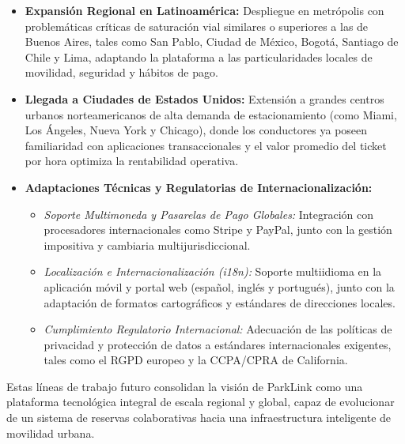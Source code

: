 \begin{itemize}
    \item \textbf{Expansión Regional en Latinoamérica:} Despliegue en metrópolis con problemáticas críticas de saturación vial similares o superiores a las de Buenos Aires, tales como San Pablo, Ciudad de México, Bogotá, Santiago de Chile y Lima, adaptando la plataforma a las particularidades locales de movilidad, seguridad y hábitos de pago.
    \item \textbf{Llegada a Ciudades de Estados Unidos:} Extensión a grandes centros urbanos norteamericanos de alta demanda de estacionamiento (como Miami, Los Ángeles, Nueva York y Chicago), donde los conductores ya poseen familiaridad con aplicaciones transaccionales y el valor promedio del ticket por hora optimiza la rentabilidad operativa.
    \item \textbf{Adaptaciones Técnicas y Regulatorias de Internacionalización:}
    \begin{itemize}
        \item \textit{Soporte Multimoneda y Pasarelas de Pago Globales:} Integración con procesadores internacionales como Stripe y PayPal, junto con la gestión impositiva y cambiaria multijurisdiccional.
        \item \textit{Localización e Internacionalización (i18n):} Soporte multiidioma en la aplicación móvil y portal web (español, inglés y portugués), junto con la adaptación de formatos cartográficos y estándares de direcciones locales.
        \item \textit{Cumplimiento Regulatorio Internacional:} Adecuación de las políticas de privacidad y protección de datos a estándares internacionales exigentes, tales como el RGPD europeo y la CCPA/CPRA de California.
    \end{itemize}
\end{itemize}

Estas líneas de trabajo futuro consolidan la visión de ParkLink como una plataforma tecnológica integral de escala regional y global, capaz de evolucionar de un sistema de reservas colaborativas hacia una infraestructura inteligente de movilidad urbana.
